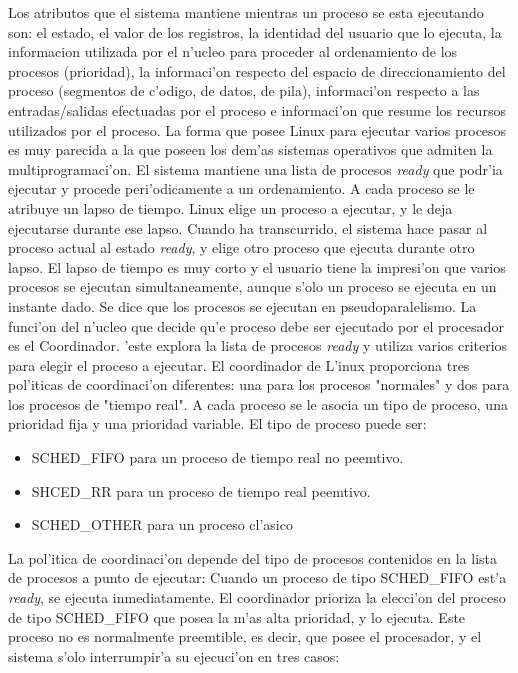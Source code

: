 Los atributos que el sistema mantiene mientras un proceso se esta ejecutando son: el estado, el valor de los registros, la identidad del usuario que lo ejecuta, la informacion utilizada por el n'ucleo para proceder al ordenamiento de los procesos (prioridad), la informaci'on respecto del espacio de direccionamiento del proceso (segmentos de c'odigo, de datos, de pila), informaci'on respecto a las entradas/salidas efectuadas por el proceso e informaci'on que resume los recursos utilizados por el proceso.
La forma que posee Linux para ejecutar varios procesos es muy parecida a la que poseen los dem'as sistemas operativos que admiten la multiprogramaci'on. El sistema mantiene una lista de procesos \textit{ready} que podr'ia ejecutar y procede peri'odicamente a un ordenamiento. A cada proceso se le atribuye un lapso de tiempo. Linux elige un proceso a ejecutar, y le deja ejecutarse durante ese lapso. Cuando ha transcurrido, el sistema hace pasar al proceso actual al estado \emph{ready}, y elige otro proceso que ejecuta durante otro lapso. El lapso de tiempo es muy corto y el usuario tiene la impresi'on que varios procesos se ejecutan simultaneamente, aunque s'olo un proceso se ejecuta en un instante dado. Se dice que los procesos se ejecutan en pseudoparalelismo.
La funci'on del n'ucleo que decide qu'e proceso debe ser ejecutado por el procesador es el Coordinador. 'este explora la lista de procesos \textit{ready} y utiliza varios criterios para elegir el proceso a ejecutar. El coordinador de L'inux proporciona tres pol'iticas de coordinaci'on diferentes: una para los procesos "normales" y dos para los procesos de "tiempo real".
A cada proceso se le asocia un tipo de proceso, una prioridad fija y una prioridad variable. El tipo de proceso puede ser:

\begin{itemize}
	\item SCHED\_FIFO para un proceso de tiempo real no peemtivo.
	\item SHCED\_RR para un proceso de tiempo real peemtivo.
	\item SCHED\_OTHER para un proceso cl'asico
\end{itemize}

La pol'itica de coordinaci'on depende del tipo de procesos contenidos en la lista de procesos a punto de ejecutar:
Cuando un proceso de tipo SCHED\_FIFO est'a \textit{ready}, se ejecuta inmediatamente. El coordinador prioriza la elecci'on del proceso de tipo SCHED\_FIFO que posea la m'as alta prioridad, y lo ejecuta. Este proceso no es normalmente preemtible, es decir, que posee el procesador, y el sistema s'olo interrumpir'a su ejecuci'on en tres casos:

